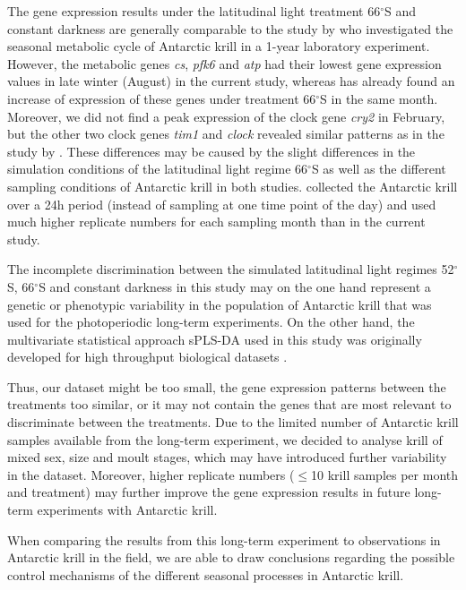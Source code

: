 The gene expression results under the latitudinal light treatment 66$^{\circ}$S
and constant darkness are generally comparable to the study by
\citet{piccolin_seasonal_2018} who investigated the seasonal metabolic cycle of
Antarctic krill in a 1-year laboratory experiment. However, the metabolic genes
\textit{cs}, \textit{pfk6} and \textit{atp} had their lowest gene expression
values in late winter (August) in the current study, whereas
\citet{piccolin_seasonal_2018} has already found an increase of expression of
these genes under treatment 66$^{\circ}$S in the same month. Moreover, we did
not find a peak expression of the clock gene \textit{cry2} in February, but the
other two clock genes \textit{tim1} and \textit{clock} revealed similar
patterns as in the study by \citet{piccolin_seasonal_2018}. These differences
may be caused by the slight differences in the simulation conditions of the
latitudinal light regime 66$^{\circ}$S as well as the different sampling
conditions of Antarctic krill in both studies. \citet{piccolin_seasonal_2018}
collected the Antarctic krill over a 24h period (instead of sampling at one
time point of the day) and used much higher replicate numbers for each sampling
month than in the current study.

The incomplete discrimination between the simulated latitudinal light regimes
52$^{\circ}$S, 66$^{\circ}$S and constant darkness in this study may on the one
hand represent a genetic or phenotypic variability in the population of
Antarctic krill that was used for the photoperiodic long-term experiments. On
the other hand, the multivariate statistical approach sPLS-DA used in this
study was originally developed for high throughput biological datasets
\citep{le_cao_sparse_2011}.

Thus, our dataset might be too small, the gene expression patterns between the
treatments too similar, or it may not contain the genes that are most relevant
to discriminate between the treatments. Due to the limited number of Antarctic
krill samples available from the long-term experiment, we decided to analyse
krill of mixed sex, size and moult stages, which may have introduced further
variability in the dataset. Moreover, higher replicate numbers ($\leq$10 krill
samples per month and treatment) may further improve the gene expression
results in future long-term experiments with Antarctic krill.

When comparing the results from this long-term experiment to observations in
Antarctic krill in the field, we are able to draw conclusions regarding the
possible control mechanisms of the different seasonal processes in Antarctic
krill.

